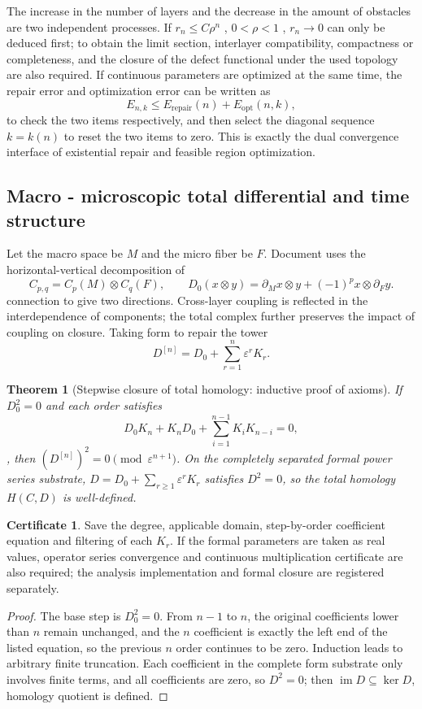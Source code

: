 \documentclass[11pt,a4paper]{article}
\theoremstyle{plain}
\newtheorem{theorem}{Theorem}[section]
\theoremstyle{definition}
\newtheorem*{certificate}{Certificate}
\theoremstyle{remark}
\begin{document}
\begin{CJK*}
The increase in the number of layers and the decrease in the amount of obstacles are two independent processes. If $r_n\le C\rho^n$ , $0<\rho<1$ , $r_n\to0$ can only be deduced first; to obtain the limit section, interlayer compatibility, compactness or completeness, and the closure of the defect functional under the used topology are also required. If continuous parameters are optimized at the same time, the repair error and optimization error can be written as \[
 E_{n,k}\le E_{\mathrm{repair}}(n)+E_{\mathrm{opt}}(n,k),
\] to check the two items respectively, and then select the diagonal sequence $k=k(n)$ to reset the two items to zero. This is exactly the dual convergence interface of existential repair and feasible region optimization.

\subsection { Macro - microscopic total differential and time structure }

Let the macro space be $M$ and the micro fiber be $F$. Document \cite{S27} uses the horizontal-vertical decomposition of \[
 C_{p,q}=C_p(M)\otimes C_q(F),\qquad
 D_0(x\otimes y)=\partial_Mx\otimes y+(-1)^p x\otimes\partial_Fy.
\] connection to give two directions. Cross-layer coupling is reflected in the interdependence of components; the total complex further preserves the impact of coupling on closure. Taking form to repair the tower \[
 D^{[n]}=D_0+\sum_{r=1}^{n}\varepsilon^rK_r.
\]

\begin{theorem}
[Stepwise closure of total homology: inductive proof of axioms]\label{ss:total}
If $D_0^2=0$ and each order satisfies \[
 D_0K_n+K_nD_0+\sum_{i=1}^{n-1}K_iK_{n-i}=0,
\], then $(D^{[n]})^2=0\pmod{\varepsilon^{n+1}}$. On the completely separated formal power series substrate, $D=D_0+\sum_{r\ge1}\varepsilon^rK_r$ satisfies $D^2=0$, so the total homology $H(C,D)$ is well-defined.\end{theorem}
\begin{certificate}
Save the degree, applicable domain, step-by-order coefficient equation and filtering of each $K_r$. If the formal parameters are taken as real values, operator series convergence and continuous multiplication certificate are also required; the analysis implementation and formal closure are registered separately.\end{certificate}
\begin{proof}
The base step is $D_0^2=0$. From $n-1$ to $n$, the original coefficients lower than $n$ remain unchanged, and the $n$ coefficient is exactly the left end of the listed equation, so the previous $n$ order continues to be zero. Induction leads to arbitrary finite truncation. Each coefficient in the complete form substrate only involves finite terms, and all coefficients are zero, so $D^2=0$; then $\operatorname{im}D\subseteq\ker D$, homology quotient is defined.\end{proof}



\end{CJK*}
\end{document}
